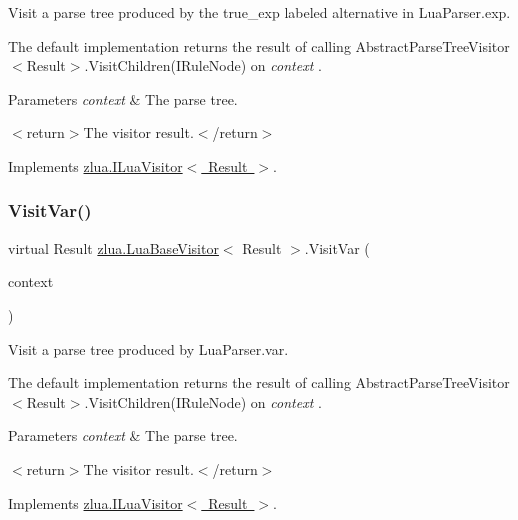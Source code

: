 Visit a parse tree produced by the {\ttfamily true\+\_\+exp} labeled alternative in Lua\+Parser.\+exp. 

The default implementation returns the result of calling Abstract\+Parse\+Tree\+Visitor$<$\+Result$>$.\+Visit\+Children(\+I\+Rule\+Node) on {\itshape context} . 


\begin{DoxyParams}{Parameters}
{\em context} & The parse tree.\\
\hline
\end{DoxyParams}
$<$return$>$The visitor result.$<$/return$>$ 

Implements \mbox{\hyperlink{interfacezlua_1_1_i_lua_visitor_acaf973648f49c466c44d3306915b0028}{zlua.\+I\+Lua\+Visitor$<$ Result $>$}}.

\mbox{\label{classzlua_1_1_lua_base_visitor_afdd236b54f45e1667274018d2ace456d}} 
\subsubsection{\texorpdfstring{Visit\+Var()}{VisitVar()}}
{\footnotesize\ttfamily virtual Result \mbox{\hyperlink{classzlua_1_1_lua_base_visitor}{zlua.\+Lua\+Base\+Visitor}}$<$ Result $>$.Visit\+Var (\begin{DoxyParamCaption}\item[{\mbox{[}\+Not\+Null\mbox{]} \mbox{\hyperlink{classzlua_1_1_lua_parser_1_1_var_context}{Lua\+Parser.\+Var\+Context}}}]{context }\end{DoxyParamCaption})\hspace{0.3cm}{\ttfamily [virtual]}}



Visit a parse tree produced by Lua\+Parser.\+var. 

The default implementation returns the result of calling Abstract\+Parse\+Tree\+Visitor$<$\+Result$>$.\+Visit\+Children(\+I\+Rule\+Node) on {\itshape context} . 


\begin{DoxyParams}{Parameters}
{\em context} & The parse tree.\\
\hline
\end{DoxyParams}
$<$return$>$The visitor result.$<$/return$>$ 

Implements \mbox{\hyperlink{interfacezlua_1_1_i_lua_visitor_aabb3bb5fa7b497446863e037f93733e7}{zlua.\+I\+Lua\+Visitor$<$ Result $>$}}.


